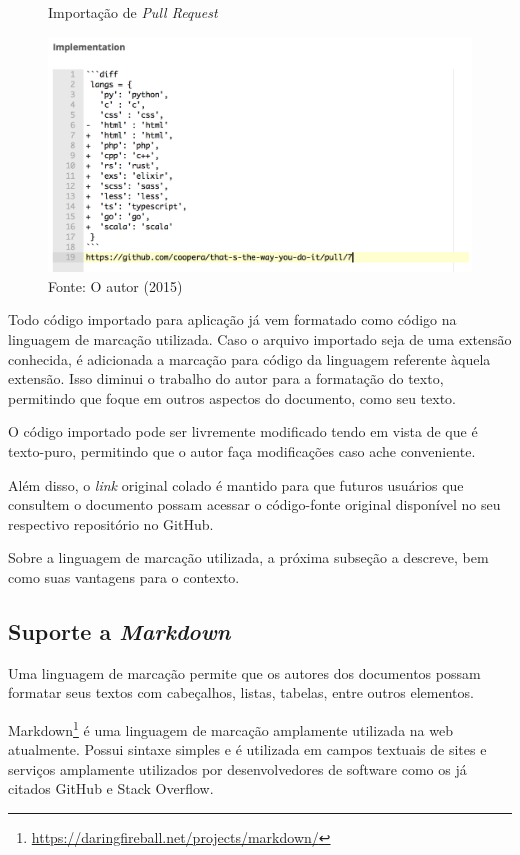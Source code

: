\begin{figure}[h]
	\centering
    \caption{Importação de \textit{Pull Request}}
    \includegraphics[width=15cm]{Imagens/import-pr.png}
	\caption*{Fonte: O autor (2015)}
\end{figure}

Todo código importado para aplicação já vem formatado como código na linguagem de marcação utilizada. Caso o arquivo importado seja de uma extensão conhecida, é adicionada a marcação para código da linguagem referente àquela extensão. Isso diminui o trabalho do autor para a formatação do texto, permitindo que foque em outros aspectos do documento, como seu texto.

O código importado pode ser livremente modificado tendo em vista de que é texto-puro, permitindo que o autor faça modificações caso ache conveniente.

Além disso, o \textit{link} original colado é mantido para que futuros usuários que consultem o documento possam acessar o código-fonte original disponível no seu respectivo repositório no GitHub.

Sobre a linguagem de marcação utilizada, a próxima subseção a descreve, bem como suas vantagens para o contexto.

\subsection{Suporte a \textit{Markdown}}

Uma linguagem de marcação permite que os autores dos documentos possam formatar seus textos com cabeçalhos, listas, tabelas, entre outros elementos.

Markdown\footnote{\url{https://daringfireball.net/projects/markdown/}} é uma linguagem de marcação amplamente utilizada na web atualmente. Possui sintaxe simples e é utilizada em campos textuais de sites e serviços amplamente utilizados por desenvolvedores de software como os já citados GitHub e Stack Overflow.

